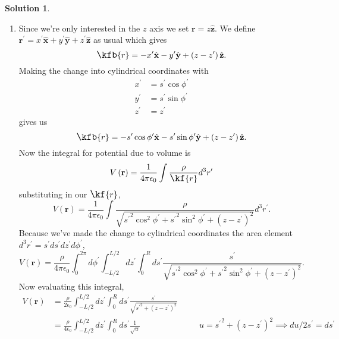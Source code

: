 \documentclass[10pt]{article}
\theoremstyle{definition}
\newtheorem{soln}{Solution}
\newcommand{\ux}{\hat{\mathbf{x}}}
\newcommand{\uy}{\hat{\mathbf{y}}}
\newcommand{\uz}{\hat{\mathbf{z}}}
\newcommand{\primed}[1]{{#1^\prime}}
\newcommand{\scriptr}{\fontsize{12pt}{12pt}\kf{r}}
\newcommand{\bscriptr}{\fontsize{12pt}{12pt}\kfb{r}}
\newcommand{\justif}[2]{&{#1}&\text{#2}}
\newcommand{\bv}[1]{\mathbf{#1}}
\begin{document}
\begin{soln}~
  \begin{enumerate}[label=(\alph*)]
    \item Since we're only interested in the $z$ axis we set $\bv{r}=z\uz$.
          We define $\primed{\bv{r}}=\primed{x}\ux+\primed{y}\uy+\primed{z}\uz$ as usual
          which gives
          $$\bscriptr=-\primed{x}\ux-\primed{y}\uy+\left(z-\primed{z}\right)\uz.$$
          Making the change into cylindrical coordinates with
          \begin{align*}
            \primed{x} & =\primed{s}\cos\primed{\phi} \\
            \primed{y} & =\primed{s}\sin\primed{\phi} \\
            \primed{z} & =\primed{z}
          \end{align*}
          gives us
          $$\bscriptr=-\primed{s}\cos\primed{\phi}\ux-\primed{s}\sin\primed{\phi}\uy+\left(z-\primed{z}\right)\uz.$$
          Now the integral for potential due to volume is
          $$V\left(\bv{r}\right)=\frac{1}{4\pi\epsilon_0}\int \frac{\rho}{\scriptr}d^3\primed{r}$$
          substituting in our $\scriptr$,
          $$V\left(\bv{r}\right)=\frac{1}{4\pi\epsilon_0}\int \frac{\rho}{
              \sqrt{\primed{s}^2\cos^2\primed{\phi}+\primed{s}^2\sin^2\primed{\phi}+\left(z-\primed{z}\right)^2}
            }d^3\primed{r}.$$
          Because we've made the change to cylindrical coordinates the area element $d^3\primed{r}=\primed{s}d\primed{s}d\primed{z}d\primed{\phi}$,
          $$V\left(\bv{r}\right)=\frac{\rho}{4\pi\epsilon_0}\int_0^{2\pi}d\primed{\phi}\int_{-L/2}^{L/2}d\primed{z}\int_0^Rd\primed{s} \frac{\primed{s}}{
              \sqrt{\primed{s}^2\cos^2\primed{\phi}+\primed{s}^2\sin^2\primed{\phi}+\left(z-\primed{z}\right)^2}
            }.$$
          Now evaluating this integral,
          \begin{align*}
            V\left(\bv{r}\right) & =\frac{\rho}{2\epsilon_0}\int_{-L/2}^{L/2}d\primed{z}\int_0^Rd\primed{s} \frac{\primed{s}}{
            \sqrt{\primed{s}^2+\left(z-\primed{z}\right)^2}}                                                                                                                                                     \\
                                 & =\frac{\rho}{4\epsilon_0}\int_{-L/2}^{L/2}d\primed{z}\int_0^Rd\primed{s} \frac{1}{\sqrt{u}}
            \justif{\quad}{$u=\primed{s}^2+\left(z-\primed{z}\right)^2\implies du/2\primed{s}=d\primed{s}$}                                                                                                      \\

\end{align*}
\end{enumerate}
\end{soln}
\end{document}
